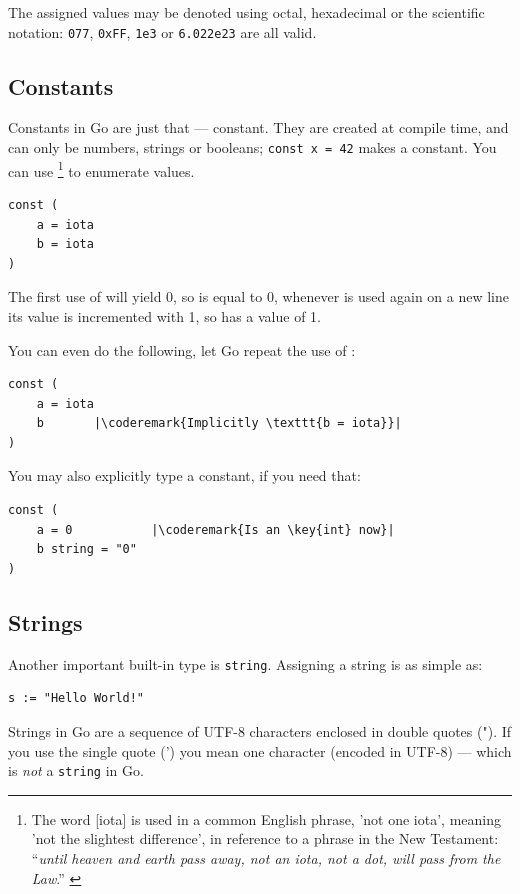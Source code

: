 \noindent{}

The assigned values may be denoted using octal, hexadecimal or the scientific notation:
\lstinline{077}, \lstinline{0xFF}, \lstinline{1e3} or
\mbox{\lstinline{6.022e23}} are all valid.

\subsection{Constants}
\label{sec:constants}
Constants in Go are just that --- constant. They are created at compile
time, and can only be numbers, strings or booleans;
\lstinline{const x = 42} makes  a constant. You can use
 \footnote{The word [iota] is used in a common English phrase,
'not one iota', meaning 'not the slightest difference', in reference to
a phrase in the New Testament: ``\emph{until heaven and earth pass away, not an
iota, not a dot, will pass from the Law}.'' \cite{iota}}
to enumerate values.
\begin{lstlisting}
const (
	a = iota
	b = iota 
)
\end{lstlisting}
The first use of  will yield 0, so  is equal to 0, whenever
 is used again on a new line its value is incremented with 1, so 
has a value of 1.

You can even do the following, let Go repeat the use of :
\begin{lstlisting}
const (
	a = iota
	b	    |\coderemark{Implicitly \texttt{b = iota}}|
)
\end{lstlisting}
You may also explicitly type a constant, if you need that:
\begin{lstlisting}
const (
	a = 0           |\coderemark{Is an \key{int} now}|
	b string = "0" 
)
\end{lstlisting}

\subsection{Strings}
Another important built-in type is \lstinline{string}. Assigning a
string is as simple as:
\begin{lstlisting}
s := "Hello World!"
\end{lstlisting}
Strings in Go are a sequence of UTF-8 characters enclosed in double
quotes ("). If you use the single quote (') you mean one character
(encoded in UTF-8) --- which is \emph{not} a \lstinline{string} in Go.

